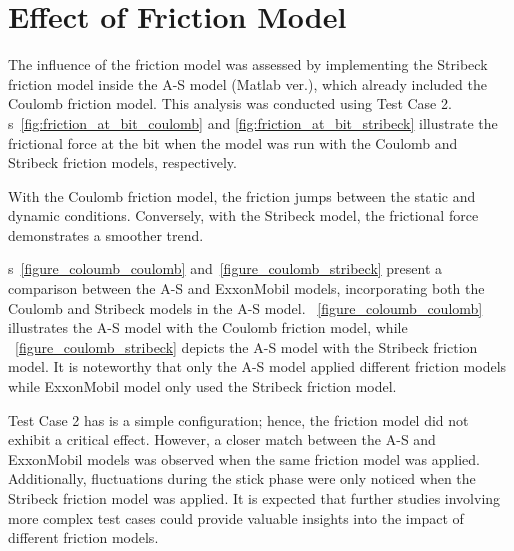 
\section{Effect of Friction Model}
The influence of the friction model was assessed by implementing the Stribeck friction model inside the A-S model (Matlab ver.), which already included the Coulomb friction model. This analysis was conducted using Test Case 2. \figurename{}s~\ref{fig:friction_at_bit_coulomb} and \ref{fig:friction_at_bit_stribeck} illustrate the frictional force at the bit when the model was run with the Coulomb and Stribeck friction models, respectively.

With the Coulomb friction model, the friction jumps between the static and dynamic conditions.  Conversely, with the Stribeck model, the frictional force demonstrates a smoother trend.

\figurename{}s~\ref{figure_coloumb_coulomb} and~\ref{figure_coulomb_stribeck} present a comparison between the A-S and ExxonMobil models, incorporating both the Coulomb and Stribeck models in the A-S model. \figurename{}~\ref{figure_coloumb_coulomb} illustrates the A-S model with the Coulomb friction model, while \figurename{}~\ref{figure_coulomb_stribeck} depicts the A-S model with the Stribeck friction model. It is noteworthy that only the A-S model applied different friction models while ExxonMobil model only used the Stribeck friction model.

Test Case 2 has is a simple configuration; hence, the friction model did not exhibit a critical effect. However, a closer match between the A-S and ExxonMobil models was observed when the same friction model was applied. Additionally, fluctuations during the stick phase were only noticed when the Stribeck friction model was applied. It is expected that further studies involving more complex test cases could provide valuable insights into the impact of different friction models.

